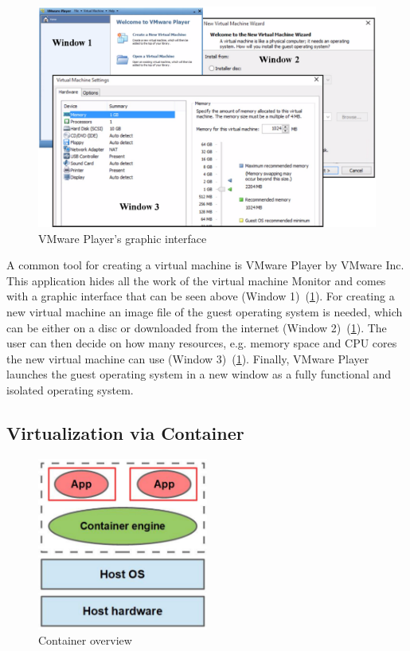\documentclass[utf8,biblatex, ngerman, english]{lni}
\begin{document}
\begin{figure}
  \centering
  \includegraphics[width=1\textwidth]{VMware Player.pdf}
  \caption{VMware Player's graphic interface}
  \label{img:VMwarePlayer}
\end{figure}

A common tool for creating a virtual machine is VMware Player by VMware Inc. This application hides all the work of the virtual machine Monitor and comes with a graphic interface that can be seen above (Window 1)\ (\ref{img:VMwarePlayer}). For creating a new virtual machine an image file of the guest operating system is needed, which can be either on a disc or downloaded from the internet (Window 2)\ (\ref{img:VMwarePlayer}). The user can then decide on how many resources, e.g. memory space and CPU cores the new virtual machine can use (Window 3)\ (\ref{img:VMwarePlayer}). Finally, VMware Player launches the guest operating system in a new window as a fully functional and isolated operating system.

\clearpage
\subsection{Virtualization via Container}

\begin{figure}
  \centering
  \includegraphics[width=0.5\textwidth]{Container.pdf}
  \caption{Container overview}
  \label{img:container}
\end{figure}
\end{document}
